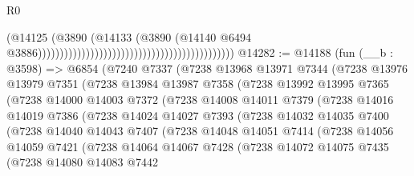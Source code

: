 \begin{lexlean}{R0}
\begin{coremodule}
                                                                                    (@14125
                                                                                      (@3890
                                                                                        (@14133
                                                                                          (@3890
                                                                                            (@14140
                                                                                              @6494
                                                                                              @3886)))))))))))))))))))))))))))))))))))))))))))))
@14282 := @14188
    (fun (__b : @3598) =>
    @6854
      (@7240
        @7337
        (@7238
          @13968
          @13971
          @7344
          (@7238
            @13976
            @13979
            @7351
            (@7238
              @13984
              @13987
              @7358
              (@7238
                @13992
                @13995
                @7365
                (@7238
                  @14000
                  @14003
                  @7372
                  (@7238
                    @14008
                    @14011
                    @7379
                    (@7238
                      @14016
                      @14019
                      @7386
                      (@7238
                        @14024
                        @14027
                        @7393
                        (@7238
                          @14032
                          @14035
                          @7400
                          (@7238
                            @14040
                            @14043
                            @7407
                            (@7238
                              @14048
                              @14051
                              @7414
                              (@7238
                                @14056
                                @14059
                                @7421
                                (@7238
                                  @14064
                                  @14067
                                  @7428
                                  (@7238
                                    @14072
                                    @14075
                                    @7435
                                    (@7238
                                      @14080
                                      @14083
                                      @7442

\end{coremodule}
\end{lexlean}

